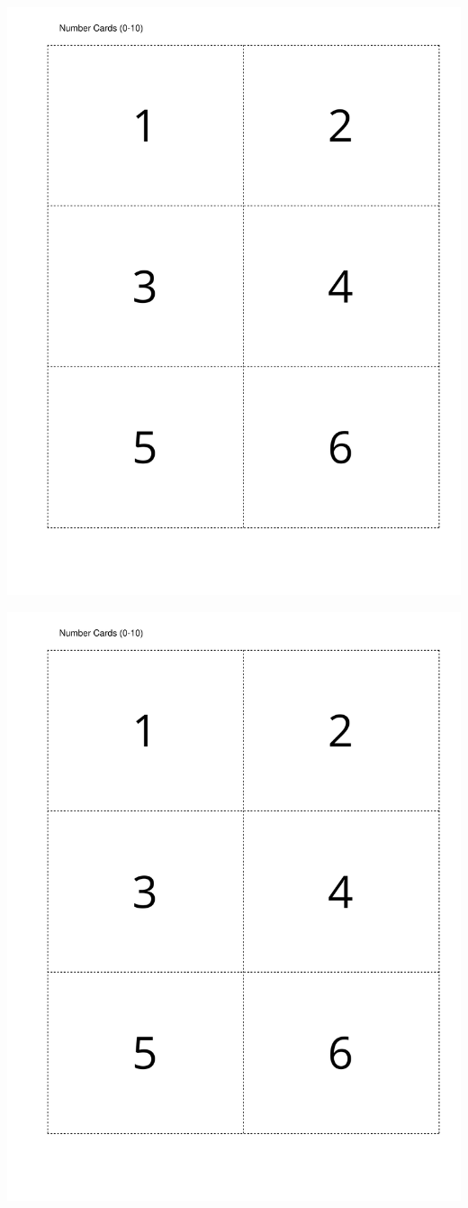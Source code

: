 \documentclass[14pt]{extarticle}
\begin{document}
\begin{image}{0}{1}{0}{}%
\includegraphics[page=3, rotate=90, scale=0.55, trim=40 40 20 40, clip, center] {external/blm/pdf-source/tarjetasDeDigitos.pdf}
\end{image}%
\begin{image}{0}{1}{0}{}%
\includegraphics[page=4, rotate=90, scale=0.55, trim=40 40 20 40, clip, center] {external/blm/pdf-source/tarjetasDeDigitos.pdf}
\end{image}%
\end{document}
